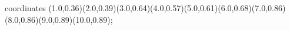 					coordinates { (1.0,0.36)(2.0,0.39)(3.0,0.64)(4.0,0.57)(5.0,0.61)(6.0,0.68)(7.0,0.86)(8.0,0.86)(9.0,0.89)(10.0,0.89)};